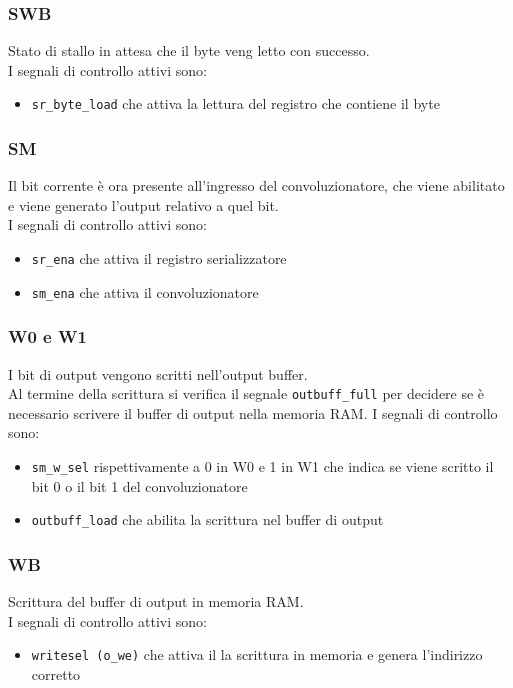 \documentclass[12pt, a4paper]{article}
\begin{document}
\subsubsection{SWB}
Stato di stallo in attesa che il byte veng letto con successo.\\
I segnali di controllo attivi sono:
\begin{itemize}
    \item \texttt{sr\_byte\_load} che attiva la lettura del registro che contiene il byte
\end{itemize}

\subsubsection{SM}
Il bit corrente è ora presente all'ingresso del convoluzionatore, che viene abilitato e viene
generato l'output relativo a quel bit.\\
I segnali di controllo attivi sono:
\begin{itemize}
    \item \texttt{sr\_ena} che attiva il registro serializzatore
    \item \texttt{sm\_ena} che attiva il convoluzionatore
\end{itemize}

\subsubsection{W0 e W1}
I bit di output vengono scritti nell'output buffer.\\
Al termine della scrittura si verifica il segnale \texttt{outbuff\_full} per decidere
se è necessario scrivere il buffer di output nella memoria RAM.
I segnali di controllo sono:
\begin{itemize}
    \item \texttt{sm\_w\_sel} rispettivamente a 0 in W0 e 1 in W1 che indica se viene 
                              scritto il bit 0 o il bit 1 del convoluzionatore
    \item \texttt{outbuff\_load} che abilita la scrittura nel buffer di output
\end{itemize}

\subsubsection{WB}
Scrittura del buffer di output in memoria RAM.\\
I segnali di controllo attivi sono:
\begin{itemize}
    \item \texttt{writesel (o\_we)} che attiva il la scrittura in memoria e genera l'indirizzo corretto
\end{itemize}
\end{document}
